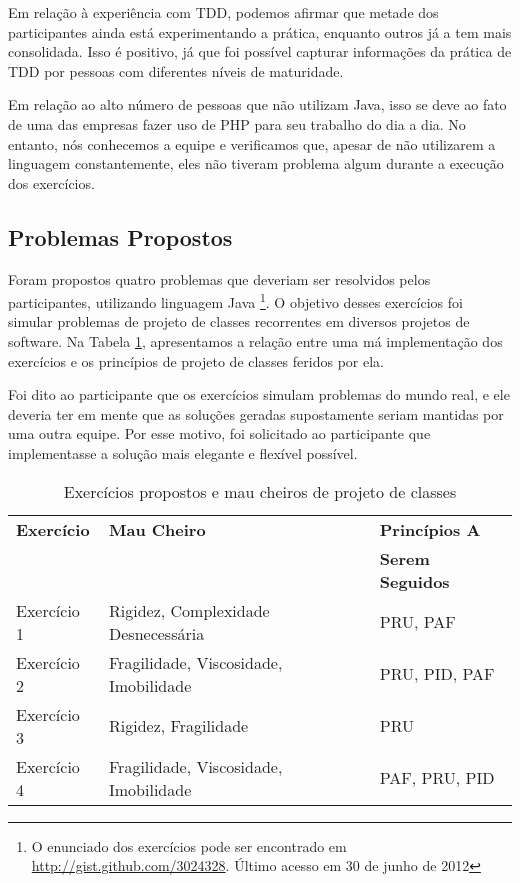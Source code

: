 \documentclass[conference]{IEEEtran}
\begin{document}
Em relação à experiência com TDD,
podemos afirmar que metade dos participantes ainda está experimentando a prática, enquanto
outros já a tem mais consolidada. Isso é positivo, já que foi possível capturar informações
da prática de TDD por pessoas com diferentes níveis de maturidade.

Em relação ao alto número de pessoas que não utilizam Java, isso se deve ao fato de uma das
empresas fazer uso de PHP para seu trabalho do dia a dia. No entanto, nós conhecemos a equipe
e verificamos que, apesar de não utilizarem a linguagem constantemente, eles não tiveram
problema algum durante a execução dos exercícios.

\subsection{Problemas Propostos}
\label{sec:exercicios}

Foram propostos quatro problemas que deveriam ser resolvidos pelos participantes, utilizando
linguagem Java \footnote{O enunciado dos exercícios pode ser encontrado 
em \url{http://gist.github.com/3024328}. Último acesso em 30 de junho de 2012}. 
O objetivo desses exercícios foi simular problemas de projeto de classes 
recorrentes em diversos projetos de software. 
Na Tabela \ref{tab:problemas-exercicios}, apresentamos a relação entre uma má
implementação dos exercícios e os princípios de projeto de classes feridos por
ela.

Foi dito ao participante que os exercícios simulam problemas do mundo real, e ele deveria
ter em mente que as soluções geradas supostamente seriam mantidas por uma outra equipe.
Por esse motivo, foi solicitado ao participante que implementasse a solução mais elegante e flexível 
possível.

\begin{table}
	\centering
	\begin{tabular}{| l | l | l | }
		\hline
		\textbf{Exercício} & \textbf{Mau Cheiro} & \textbf{Princípios A}\\
		& & \textbf{Serem Seguidos}\\
		
		\hline
		
		Exercício 1 & Rigidez, Complexidade Desnecessária & PRU, PAF \\
		Exercício 2 & Fragilidade, Viscosidade, Imobilidade & PRU, PID, PAF \\
		Exercício 3 & Rigidez, Fragilidade & PRU\\
		Exercício 4 & Fragilidade, Viscosidade, Imobilidade & PAF, PRU, PID \\
		
		\hline
	\end{tabular}
	\caption{Exercícios propostos e mau cheiros de projeto de classes}
	\label{tab:problemas-exercicios}
\end{table}
\end{document}
